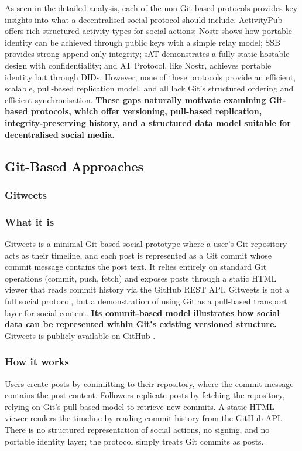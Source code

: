 As seen in the detailed analysis, each of the non-Git based protocols provides key insights into what
a decentralised social protocol should include. ActivityPub offers rich structured activity types for social actions; Nostr shows how portable identity can be achieved through public keys with a simple relay model; SSB provides strong append-only integrity; sAT demonstrates a fully static-hostable design with confidentiality; and AT Protocol, like Nostr, achieves portable identity but through DIDs. However, none of these protocols provide an efficient, scalable, pull-based replication model, and all lack Git’s structured ordering and efficient synchronisation. \textbf{These gaps naturally motivate examining Git-based protocols, which offer versioning, pull-based replication, integrity-preserving history, and a structured data model suitable for decentralised social media.}

\subsection{Git-Based Approaches}

\subsubsection{Gitweets}

\subsubsection*{What it is}
Gitweets is a minimal Git-based social prototype where a user's Git repository acts as their
timeline, and each post is represented as a Git commit whose commit message contains the
post text. It relies entirely on standard Git operations (commit, push, fetch) and exposes posts
through a static HTML viewer that reads commit history via the GitHub REST API. Gitweets is
not a full social protocol, but a demonstration of using Git as a pull-based transport layer for
social content. \textbf{Its commit-based model illustrates how social data can be represented within Git’s existing versioned structure.} Gitweets is publicly available on GitHub \cite{gitweets2026}.

\subsubsection*{How it works}
Users create posts by committing to their repository, where the commit message contains the
post content. Followers replicate posts by fetching the repository, relying on Git’s pull-based model to retrieve new commits. A static HTML viewer renders the timeline by reading commit
history from the GitHub API. There is no structured representation of social actions, no
signing, and no portable identity layer; the protocol simply treats Git commits as posts.

